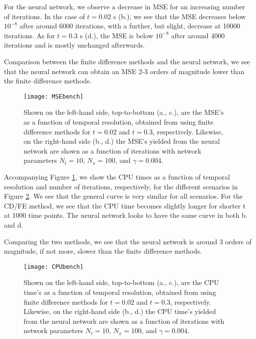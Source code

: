 For the neural network, we observe a decrease in MSE for an increasing number of iterations. In the case of $t=0.02$ s (b.), we see that the MSE decreases below $10^{-8}$ after around 6000 iterations, with a further, but slight, decrease at 10000 iterations. As for $t=0.3$ s (d.), the MSE is below $10^{-8}$ after around 4000 iterations and is mostly unchanged afterwards.

Comparison between the finite difference methods and the neural network, we see that the neural network can obtain an MSE 2-3 orders of magnitude lower than the finite difference methods.
\begin{figure}[htbp]
 	\centering
 	\texttt{[image: MSEbench]}
  \caption{Shown on the left-hand side, top-to-bottom (a., c.), are the MSE's as a function of temporal resolution, obtained from using finite difference methods for $t=0.02$ and $t=0.3$, respectively. Likewise, on the right-hand side (b., d.) the MSE's yielded from the neural network are shown as a function of iterations with network parameters $N_t = 10$, $N_x = 100$, and $\gamma = 0.004$.}
  \label{fig:MSEbench}
\end{figure}

Accompanying Figure \ref{fig:MSEbench}, we show the CPU times as a function of temporal resolution and number of iterations, respectively, for the different scenarios in Figure \ref{fig:CPUbench}. We see that the general curve is very similar for all scenarios. For the CD/FE method, we see that the CPU time becomes slightly longer for shorter t at 1000 time points. The neural network looks to have the same curve in both b. and d.

Comparing the two methods, we see that the neural network is around 3 orders of magnitude, if not more, slower than the finite difference methods.
\begin{figure}[htbp]
 	\centering
 	\texttt{[image: CPUbench]}
 	\caption{Shown on the left-hand side, top-to-bottom (a., c.), are the CPU time's as a function of temporal resolution, obtained from using finite difference methods for $t=0.02$ and $t=0.3$, respectively. Likewise, on the right-hand side (b., d.) the CPU time's yielded from the neural network are shown as a function of iterations with network parameters $N_t = 10$, $N_x = 100$, and $\gamma = 0.004$.}
  \label{fig:CPUbench}
\end{figure}

